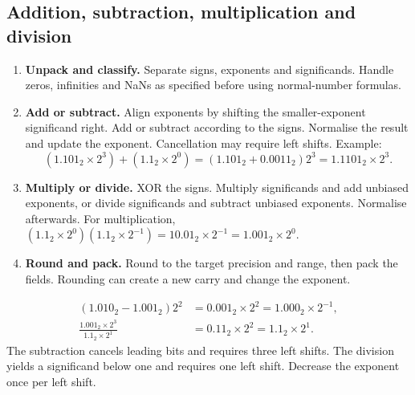 \documentclass[12pt,a4paper]{article}
\begin{document}
\subsection{Addition, subtraction, multiplication and division}
\begin{enumerate}[leftmargin=*,itemsep=3pt]
\item \textbf{Unpack and classify.} Separate signs, exponents and significands. Handle zeros, infinities and NaNs as specified before using normal-number formulas.
\item \textbf{Add or subtract.} Align exponents by shifting the smaller-exponent significand right. Add or subtract according to the signs. Normalise the result and update the exponent. Cancellation may require left shifts. Example:
\[
 (1.101_2\times2^3)+(1.1_2\times2^0)
 =(1.101_2+0.0011_2)2^3=1.1101_2\times2^3 .
\]
\item \textbf{Multiply or divide.} XOR the signs. Multiply significands and add unbiased exponents, or divide significands and subtract unbiased exponents. Normalise afterwards. For multiplication, $(1.1_2\times2^0)(1.1_2\times2^{-1})=10.01_2\times2^{-1}=1.001_2\times2^0$.
\item \textbf{Round and pack.} Round to the target precision and range, then pack the fields. Rounding can create a new carry and change the exponent.
\end{enumerate}
\begin{tcolorbox}[examplebox,title={Normalise after subtraction and division}]
\[
\begin{aligned}
(1.010_2-1.001_2)2^2
 &=0.001_2\times2^2=1.000_2\times2^{-1},\\
\frac{1.001_2\times2^3}{1.1_2\times2^1}
 &=0.11_2\times2^2=1.1_2\times2^1 .
\end{aligned}
\]
The subtraction cancels leading bits and requires three left shifts. The division yields a significand below one and requires one left shift. Decrease the exponent once per left shift.
\end{tcolorbox}
\end{document}
